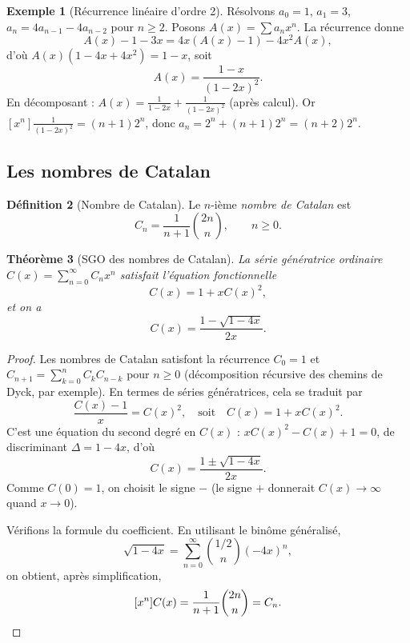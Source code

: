 \documentclass[12pt,a4paper,openany]{book}
\theoremstyle{definition}
\newtheorem{definition}{Définition}[chapter]
\newtheorem{exemple}[definition]{Exemple}
\theoremstyle{plain}
\newtheorem{theoreme}[definition]{Théorème}
\theoremstyle{remark}
\begin{document}
\begin{exemple}[Récurrence linéaire d'ordre 2]
\label{ex:ogf-rec-ordre2}
Résolvons $a_0 = 1$, $a_1 = 3$, $a_n = 4a_{n-1} - 4a_{n-2}$ pour $n \geqslant 2$.
Posons $A(x) = \sum a_n x^n$. La récurrence donne
\[
  A(x) - 1 - 3x = 4x(A(x) - 1) - 4x^2 A(x),
\]
d'où $A(x)(1 - 4x + 4x^2) = 1 - x$, soit
\[
  A(x) = \frac{1-x}{(1-2x)^2}.
\]
En décomposant : $A(x) = \frac{1}{1-2x} + \frac{1}{(1-2x)^2}$ (après calcul).
Or $[x^n]\frac{1}{(1-2x)^2} = (n+1)2^n$, donc $a_n = 2^n + (n+1)2^n = (n+2)2^n$.
\end{exemple}

\subsection{Les nombres de Catalan}
\label{sec:catalan}

\begin{definition}[Nombre de Catalan]
\label{def:catalan}
Le $n$-ième \emph{nombre de Catalan} est
\[
  C_n = \frac{1}{n+1}\binom{2n}{n}, \qquad n \geqslant 0.
\]
\end{definition}

\begin{theoreme}[SGO des nombres de Catalan]
\label{thm:catalan-ogf}
La série génératrice ordinaire $C(x) = \sum_{n=0}^\infty C_n x^n$ satisfait
l'équation fonctionnelle
\[
  C(x) = 1 + x C(x)^2,
\]
et on a
\[
  C(x) = \frac{1 - \sqrt{1 - 4x}}{2x}.
\]
\end{theoreme}

\begin{proof}
Les nombres de Catalan satisfont la récurrence
$C_0 = 1$ et $C_{n+1} = \sum_{k=0}^{n} C_k C_{n-k}$ pour $n \geqslant 0$
(décomposition récursive des chemins de Dyck, par exemple). En termes de
séries génératrices, cela se traduit par
\[
  \frac{C(x) - 1}{x} = C(x)^2,
  \quad\text{soit}\quad
  C(x) = 1 + x C(x)^2.
\]
C'est une équation du second degré en $C(x)$ :
$x C(x)^2 - C(x) + 1 = 0$, de discriminant $\Delta = 1 - 4x$, d'où
\[
  C(x) = \frac{1 \pm \sqrt{1-4x}}{2x}.
\]
Comme $C(0) = 1$, on choisit le signe $-$ (le signe $+$ donnerait $C(x) \to \infty$
quand $x \to 0$).

Vérifions la formule du coefficient. En utilisant le binôme généralisé,
\[
  \sqrt{1-4x} = \sum_{n=0}^{\infty} \binom{1/2}{n}(-4x)^n,
\]
on obtient, après simplification,
\[
  [x^n] C(x) = \frac{1}{n+1}\binom{2n}{n} = C_n. \qedhere
\]
\end{proof}
\end{document}
